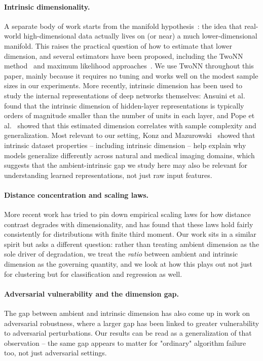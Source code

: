 \documentclass[pdflatex,sn-mathphys-num]{sn-jnl}
\theoremstyle{thmstyleone}
\begin{document}
\paragraph{Intrinsic dimensionality.}
A separate body of work starts from the manifold hypothesis~\cite{bengio2013}:
the idea that real-world high-dimensional data actually lives on (or near) a
much lower-dimensional manifold. This raises the practical question of how to
estimate that lower dimension, and several estimators have been proposed,
including the TwoNN method~\cite{facco2017} and maximum likelihood
approaches~\cite{levina2004}. We use TwoNN throughout this paper, mainly
because it requires no tuning and works well on the modest sample sizes in our
experiments. More recently, intrinsic dimension has been used to study the
internal representations of deep networks themselves: Ansuini et
al.~\cite{ansuini2019} found that the intrinsic dimension of hidden-layer
representations is typically orders of magnitude smaller than the number of
units in each layer, and Pope et al.~\cite{pope2021} showed that this
estimated dimension correlates with sample complexity and generalization. Most
relevant to our setting, Konz and Mazurowski~\cite{konz2024} showed that
intrinsic dataset properties -- including intrinsic dimension -- help explain
why models generalize differently across natural and medical imaging domains,
which suggests that the ambient-intrinsic gap we study here may also be
relevant for understanding learned representations, not just raw input
features.

\paragraph{Distance concentration and scaling laws.}
More recent work has tried to pin down empirical scaling laws for how distance
contrast degrades with dimensionality, and has found that these laws hold
fairly consistently for distributions with finite third moment. Our work sits
in a similar spirit but asks a different question: rather than treating ambient
dimension as the sole driver of degradation, we treat the \textit{ratio}
between ambient and intrinsic dimension as the governing quantity, and we look
at how this plays out not just for clustering but for classification and
regression as well.

\paragraph{Adversarial vulnerability and the dimension gap.}
The gap between ambient and intrinsic dimension has also come up in work on
adversarial robustness, where a larger gap has been linked to greater
vulnerability to adversarial perturbations. Our results can be read as a
generalization of that observation -- the same gap appears to matter for
"ordinary" algorithm failure too, not just adversarial settings.
\end{document}
